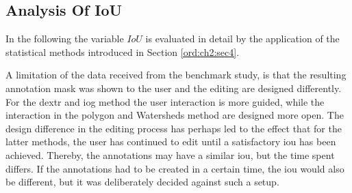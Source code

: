 \begin{table}[h!]
	\centering
	\caption[Correlation table]{
		Correlation table based on the \textit{Pearson} standard correlation coefficient \cite{Kirch08-CorrPearson}.
		The variables $ n_{clicks} $, $ n_{strokes} $, $ time_{strokes} $, and $ ws $ all show some correlation with $ time_{annot} $, while their combination $ cws $ shows a strong correlation. 
		The correlation between $ IoU $ and $ time_{annot} $ is almost not existent.
	}\label{tab:ch5:correlation-matrix}
\end{table}


\subsection{Analysis Of IoU}\label{ord:ch5:sec1:subsec2}

In the following the variable $IoU$ is evaluated in detail by the application of the statistical methods introduced in Section \ref{ord:ch2:sec4}.

A limitation of the data received from the benchmark study, is that the resulting annotation mask was shown to the user and the editing are designed differently.
For the \gls{dextr} and \gls{iog} method the user interaction is more guided, while the interaction in the polygon and Watersheds method are designed more open.
The design difference in the editing process has perhaps led to the effect that for the latter methods, the user has continued to edit until a satisfactory \gls{iou} has been achieved.
Thereby, the annotations may have a similar \gls{iou}, but the time spent differs.
If the annotations had to be created in a certain time, the \gls{iou} would also be different, but it was deliberately decided against such a setup.

